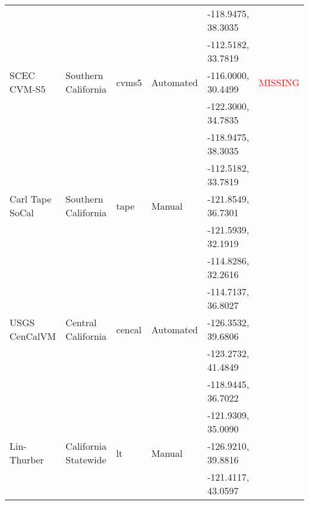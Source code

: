 \begin{table*}[ht!]
\begin{tabular}[]{llllll}
                   &                       &               &              & -118.9475, 38.3035 & \citet{Lee_2014_SRL}         \\
                   &                       &               &              & -112.5182, 33.7819 &                              \\
\color{red}
SCEC CVM-S5        & Southern California   & cvms5         &  Automated   & -116.0000, 30.4499 & \textcolor{red}{MISSING}     \\
                   &                       &               &              & -122.3000, 34.7835 &                              \\
                   &                       &               &              & -118.9475, 38.3035 &                              \\
                   &                       &               &              & -112.5182, 33.7819 &                              \\
Carl Tape SoCal    & Southern California   & tape          &  Manual      & -121.8549, 36.7301 & \citet{Tape_2010_GJI}        \\
                   &                       &               &              & -121.5939, 32.1919 &                              \\
                   &                       &               &              & -114.8286, 32.2616 &                              \\
                   &                       &               &              & -114.7137, 36.8027 &                              \\
USGS CenCalVM      & Central California    & cencal        &  Automated   & -126.3532, 39.6806 & \citet{Brocher_2005_Tech}    \\
                   &                       &               &              & -123.2732, 41.4849 & \citet{Brocher_2006_Proc}    \\
                   &                       &               &              & -118.9445, 36.7022 &                              \\
                   &                       &               &              & -121.9309, 35.0090 &                              \\
Lin-Thurber        & California Statewide  & lt            &  Manual      & -126.9210, 39.8816 & \citet{Lin_2010_BSSA}        \\
                   &                       &               &              & -121.4117, 43.0597 &                              \\

\end{tabular}
\end{table*}
